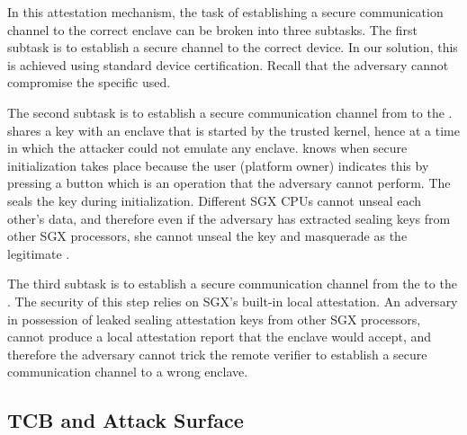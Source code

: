 
In this attestation mechanism, the task of establishing a secure communication channel to the correct enclave can be broken into three subtasks. The first subtask is to establish a secure channel to the correct \device device. In our solution, this is achieved using standard device certification. Recall that the adversary cannot compromise the specific \device used. 

The second subtask is to establish a secure communication channel from \device to the \nameclave. 
\device shares a key with an enclave that is started by the trusted \name kernel, hence at a time in which the attacker could not emulate any enclave. \device knows when secure initialization takes place because the user (platform owner) indicates this by pressing a button which is an operation that the adversary cannot perform. The \nameclave seals the key during initialization. Different SGX CPUs cannot unseal each other's data, and therefore even if the adversary has extracted sealing keys from other SGX processors, she cannot unseal the key and masquerade as the legitimate \nameclave. %

The third subtask is to establish a secure communication channel from the \nameclave to the \app. The security of this step relies on SGX's built-in local attestation. An adversary in possession of leaked sealing attestation keys from other SGX processors, cannot produce a local attestation report that the \name enclave would accept, and therefore the adversary cannot trick the remote verifier to establish a secure communication channel to a wrong enclave.

\iffalse
\subsection{TCB and Attack Surface}

